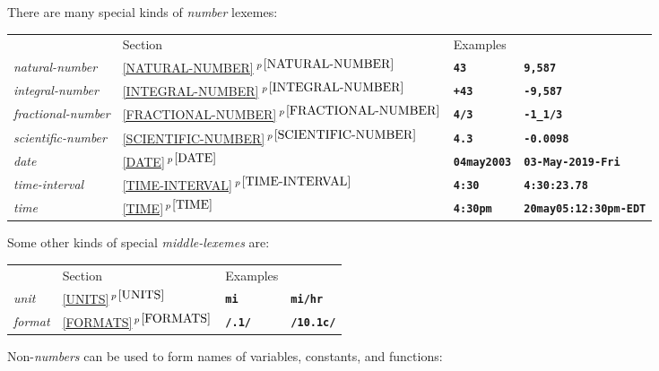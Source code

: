 \documentclass[12pt]{article}
\newcommand{\TT}[1]{{\tt \bfseries #1}}
\newcommand{\itemref}[1]{\ref{#1}$\,^{p\,\pageref{#1}}$}
\newenvironment{indpar}[1][0.3in]%
	{\begin{list}{}%
		     {\setlength{\itemsep}{0in}%
		      \setlength{\topsep}{0in}%
		      \setlength{\parsep}{1ex}%
		      \setlength{\labelwidth}{#1}%
		      \setlength{\leftmargin}{#1}%
		      \addtolength{\leftmargin}{\labelsep}}%
	 \item}%
	{\end{list}}
\begin{document}
There are many special kinds of {\em number} lexemes:
\begin{indpar}
    \begin{tabular}[t]{l@{~~~~~}lll}
          & Section & Examples \\[1ex]
      {\em natural-number}
    & \itemref{NATURAL-NUMBER}
    & \TT{43} 
    & \TT{9,587} \\
      {\em integral-number}
    & \itemref{INTEGRAL-NUMBER}
    & \TT{+43} 
    & \TT{-9,587} \\
      {\em fractional-number}
    & \itemref{FRACTIONAL-NUMBER}
    & \TT{4/3}
    & \TT{-1\_1/3} \\
      {\em scientific-number}
    & \itemref{SCIENTIFIC-NUMBER}
    & \TT{4.3}
    & \TT{-0.0098} \\
      {\em date}
    & \itemref{DATE}
    & \TT{04may2003}
    & \TT{03-May-2019-Fri} \\
      {\em time-interval}
    & \itemref{TIME-INTERVAL}
    & \TT{4:30}
    & \TT{4:30:23.78} \\
      {\em time}
    & \itemref{TIME}
    & \TT{4:30pm}
    & \TT{20may05:12:30pm-EDT} \\
    \end{tabular}
\end{indpar}

Some other kinds of special {\em middle-lexemes} are:
\begin{indpar}
    \begin{tabular}[t]{l@{~~~~~~~~~~~~~~~}lll}
          & Section & Examples \\[1ex]
      {\em unit}
    & \itemref{UNITS}
    & \TT{mi}
    & \TT{mi/hr} \\
      {\em format}
    & \itemref{FORMATS}
    & \TT{/.1/}
    & \TT{/10.1c/} \\
    \end{tabular}
\end{indpar}

Non-{\em numbers} can be used to form names of variables,
constants, and functions:
\end{document}
